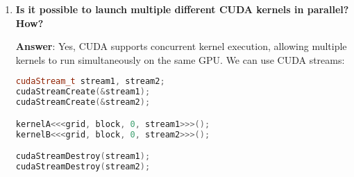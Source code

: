 \begin{enumerate}[label=\Alph*.]
    \item \textcolor{Green3}{\textbf{
        Is it possible to launch multiple different CUDA kernels in parallel? How?
    }}

    \textbf{Answer}:  Yes, CUDA supports concurrent kernel execution, allowing multiple kernels to run simultaneously on the same GPU. We can use CUDA streams:
    \begin{lstlisting}[language=c++]
cudaStream_t stream1, stream2;
cudaStreamCreate(&stream1);
cudaStreamCreate(&stream2);

kernelA<<<grid, block, 0, stream1>>>();
kernelB<<<grid, block, 0, stream2>>>();

cudaStreamDestroy(stream1);
cudaStreamDestroy(stream2);\end{lstlisting}
\end{enumerate}

\newpage

